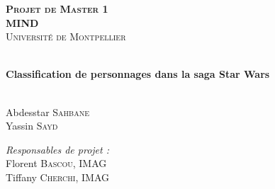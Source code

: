 \begin{titlepage}
  \begin{center}
    \vspace*{-2.5cm}
    
    
    \begin{figure}[!h]
        \centering
        \hfill

    \end{figure}
\vspace*{.5cm}
    
    
 \textsc{\Huge \textbf{Projet de Master 1 \\[0.25cm] MIND }}\\[1.cm]
  
 {\LARGE  { \textsc{ Université de Montpellier }}}\\[1.cm]


\HRule\\[0.5cm]
    \begin{spacing}{2.0}
        {\Huge \textbf{Classification de personnages dans la saga Star Wars} }  
    \end{spacing} 
\HRule\\[1.5cm]



{\LARGE  Abdesstar \textsc{Sahbane} \\
 Yassin  \textsc{Sayd}}   \vspace*{1.5cm}
 
{\Large \textit{Responsables de projet :}\\[0.25cm] Florent \textsc{Bascou}, IMAG
\\ Tiffany \textsc{Cherchi}, IMAG} \vspace*{1.5cm}


\vfill 

  \end{center}
\end{titlepage}




